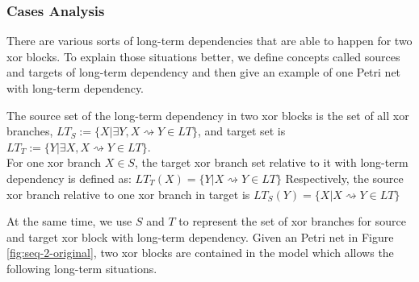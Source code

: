 \subsubsection{Cases Analysis}
There are various sorts of long-term dependencies that are able to happen for two xor blocks. To explain those situations better, we define concepts called sources and targets of long-term dependency and then give an example of one Petri net with long-term dependency.
\begin{definition}
	The source set of the long-term dependency in two xor blocks is the set of all  xor branches, $LT_S:= \{X \vert \exists Y, X\rightsquigarrow Y  \in LT \} $, and target set is $LT_T:= \{Y \vert \exists X, X\rightsquigarrow Y \in LT \} $. \\
	For one xor branch $X \in S$, the target xor branch set relative to it with long-term dependency is defined as:
	$ LT_T(X)= \{Y \vert  X\rightsquigarrow Y \in LT \}$
	Respectively, the source xor branch relative to one xor branch in target is
	$ LT_S(Y)= \{X \vert  X\rightsquigarrow Y \in LT \}$
\end{definition}
At the same time, we use $S $ and $T$ to represent the set of xor branches for source and target xor block with long-term dependency.
Given an Petri net in Figure \ref{fig:seq-2-original}, two xor blocks are contained in the model which allows the following long-term situations.

